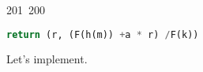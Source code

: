 201~200~\documentclass{article}
\begin{document}
\begin{lstlisting}[language=Python, caption=Signature Chall 4]
	                                                                        	                                                                    	                                	                    	                    	                        	                        	                    	                                                                	                	                                                                    	                    							                                                                                                                                                                                                    		                                                                                                                        				    			                                                                                        return (r, (F(h(m)) +a * r) /F(k))
	                                                                        	                                                                    	                                	                    	                    	                        	                        	                    	                                                                	                	                                                                    	                    							                                                                                                                                                                                                    		                                                                                                                        				    			                                                                                        \end{lstlisting}

	                                                                        	                                                                    	                                	                    	                    	                        	                        	                    	                                                                	                	                                                                    	                    							                                                                                                                                                                                                    		                                                                                                                        				    			                                                                                        Let's implement.
\end{document}
